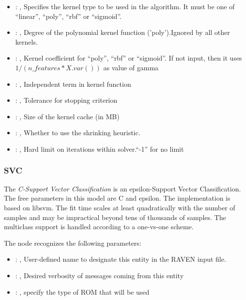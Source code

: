 \begin{itemize}
    \item {}: , 
      Specifies the kernel type to be used in the algorithm. It must be one of
      ``linear'', ``poly'', ``rbf'' or ``sigmoid''.

    \item {}: , 
      Degree of the polynomial kernel function ('poly').Ignored by all other kernels.

    \item {}: , 
      Kernel coefficient for ``poly'', ``rbf'' or ``sigmoid''. If not input, then it uses
      $1 / (n\_features * X.var())$ as value of gamma

    \item {}: , 
      Independent term in kernel function

    \item {}: , 
      Tolerance for stopping criterion

    \item {}: , 
      Size of the kernel cache (in MB)

    \item {}: , 
      Whether to use the shrinking heuristic.

    \item {}: , 
      Hard limit on iterations within solver.``-1'' for no limit
  \end{itemize}


\subsubsection{SVC}
  The  \textit{C-Support Vector Classification} is an epsilon-Support Vector
  Classification.                             The free parameters in this model are C and epsilon.
  The implementation is based on libsvm. The fit time scales at least
  quadratically with the number of samples and may be impractical                             beyond
  tens of thousands of samples. The multiclass support is handled according to a one-vs-one scheme.

  The  node recognizes the following parameters:
    \begin{itemize}
      \item {}: , 
        User-defined name to designate this entity in the RAVEN input file.
      \item {}: , 
        Desired verbosity of messages coming from this entity
      \item {}: , 
        specify the type of ROM that will be used
  \end{itemize}

